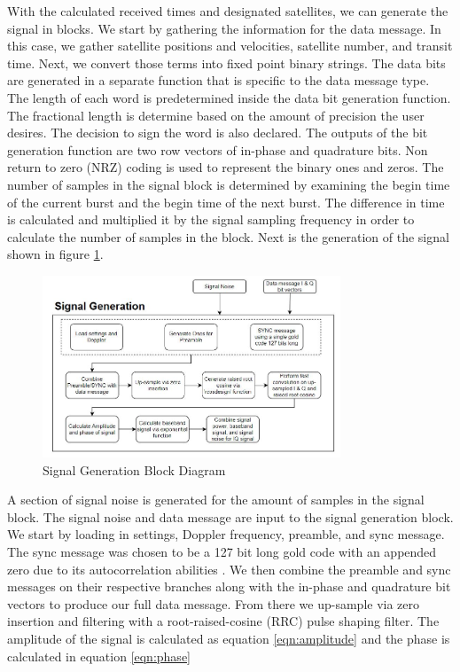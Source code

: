 \documentclass[12pt]{report}
\begin{document}
With the calculated received times and designated satellites, we can generate the signal in blocks. We start by gathering the information for the data message. In this case, we gather satellite positions and velocities, satellite number, and transit time. Next, we convert those terms into fixed point binary strings. The data bits are generated in a separate function that is specific to the data message type. The length of each word is predetermined inside the data bit generation function.  The fractional length is determine based on the amount of precision the user desires. The decision to sign the word is also declared.  The outputs of the bit generation function are two row vectors of in-phase and quadrature bits. Non return to zero (NRZ) coding is used to represent the binary ones and zeros. The number of samples in the signal block is determined by examining the begin time of the current burst and the begin time of the next burst. The difference in time is calculated and multiplied it by the signal sampling frequency in order to calculate the number of samples in the block. Next is the generation of the signal shown in figure \ref{fig:SigGenBlock}. 

\begin{figure}[h]
    \centering
    \includegraphics[width=3.5in]{SignalGenBlockDiagram}
    \caption{Signal Generation Block Diagram}
    \label{fig:SigGenBlock}
\end{figure}

A section of signal noise is generated for the amount of samples in the signal block. The signal noise and data message are input to the signal generation block. We start by loading in settings, Doppler frequency, preamble, and sync message. The sync message was chosen to be a 127 bit long gold code with an appended zero due to its autocorrelation abilities \cite{dinanSpreadingCodesDirect1998}.  We then combine the preamble and sync messages on their respective branches along with the in-phase and quadrature bit vectors to produce our full data message. From there we up-sample via zero insertion and filtering with a root-raised-cosine (RRC) pulse shaping filter. The amplitude of the signal is calculated as equation \ref{eqn:amplitude} and the phase is calculated in equation \ref{eqn:phase}
\end{document}
